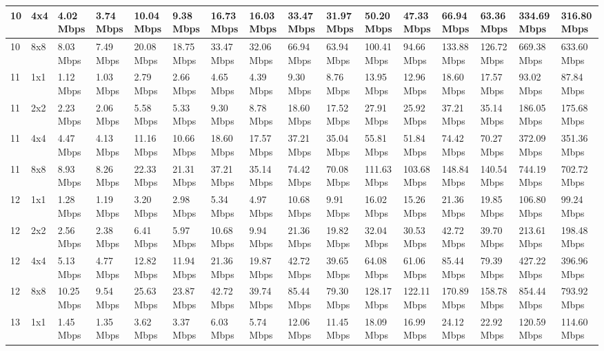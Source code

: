 \documentclass[12pt]{article}
\begin{document}
\begin{longtable}[c]{|l|l|l|l|l|l|l|l|l|l|l|l|l|l|l|l|}
10 & 4x4 & 4.02 Mbps & 3.74 Mbps & 10.04 Mbps & 9.38 Mbps & 16.73 Mbps & 16.03 Mbps & 33.47 Mbps & 31.97 Mbps & 50.20 Mbps & 47.33 Mbps & 66.94 Mbps & 63.36 Mbps & 334.69 Mbps & 316.80 Mbps \\ \hline
10 & 8x8 & 8.03 Mbps & 7.49 Mbps & 20.08 Mbps & 18.75 Mbps & 33.47 Mbps & 32.06 Mbps & 66.94 Mbps & 63.94 Mbps & 100.41 Mbps & 94.66 Mbps & 133.88 Mbps & 126.72 Mbps & 669.38 Mbps & 633.60 Mbps \\ \hline
11 & 1x1 & 1.12 Mbps & 1.03 Mbps & 2.79 Mbps & 2.66 Mbps & 4.65 Mbps & 4.39 Mbps & 9.30 Mbps & 8.76 Mbps & 13.95 Mbps & 12.96 Mbps & 18.60 Mbps & 17.57 Mbps & 93.02 Mbps & 87.84 Mbps \\ \hline
11 & 2x2 & 2.23 Mbps & 2.06 Mbps & 5.58 Mbps & 5.33 Mbps & 9.30 Mbps & 8.78 Mbps & 18.60 Mbps & 17.52 Mbps & 27.91 Mbps & 25.92 Mbps & 37.21 Mbps & 35.14 Mbps & 186.05 Mbps & 175.68 Mbps \\ \hline
11 & 4x4 & 4.47 Mbps & 4.13 Mbps & 11.16 Mbps & 10.66 Mbps & 18.60 Mbps & 17.57 Mbps & 37.21 Mbps & 35.04 Mbps & 55.81 Mbps & 51.84 Mbps & 74.42 Mbps & 70.27 Mbps & 372.09 Mbps & 351.36 Mbps \\ \hline
11 & 8x8 & 8.93 Mbps & 8.26 Mbps & 22.33 Mbps & 21.31 Mbps & 37.21 Mbps & 35.14 Mbps & 74.42 Mbps & 70.08 Mbps & 111.63 Mbps & 103.68 Mbps & 148.84 Mbps & 140.54 Mbps & 744.19 Mbps & 702.72 Mbps \\ \hline
12 & 1x1 & 1.28 Mbps & 1.19 Mbps & 3.20 Mbps & 2.98 Mbps & 5.34 Mbps & 4.97 Mbps & 10.68 Mbps & 9.91 Mbps & 16.02 Mbps & 15.26 Mbps & 21.36 Mbps & 19.85 Mbps & 106.80 Mbps & 99.24 Mbps \\ \hline
12 & 2x2 & 2.56 Mbps & 2.38 Mbps & 6.41 Mbps & 5.97 Mbps & 10.68 Mbps & 9.94 Mbps & 21.36 Mbps & 19.82 Mbps & 32.04 Mbps & 30.53 Mbps & 42.72 Mbps & 39.70 Mbps & 213.61 Mbps & 198.48 Mbps \\ \hline
12 & 4x4 & 5.13 Mbps & 4.77 Mbps & 12.82 Mbps & 11.94 Mbps & 21.36 Mbps & 19.87 Mbps & 42.72 Mbps & 39.65 Mbps & 64.08 Mbps & 61.06 Mbps & 85.44 Mbps & 79.39 Mbps & 427.22 Mbps & 396.96 Mbps \\ \hline
12 & 8x8 & 10.25 Mbps & 9.54 Mbps & 25.63 Mbps & 23.87 Mbps & 42.72 Mbps & 39.74 Mbps & 85.44 Mbps & 79.30 Mbps & 128.17 Mbps & 122.11 Mbps & 170.89 Mbps & 158.78 Mbps & 854.44 Mbps & 793.92 Mbps \\ \hline
13 & 1x1 & 1.45 Mbps & 1.35 Mbps & 3.62 Mbps & 3.37 Mbps & 6.03 Mbps & 5.74 Mbps & 12.06 Mbps & 11.45 Mbps & 18.09 Mbps & 16.99 Mbps & 24.12 Mbps & 22.92 Mbps & 120.59 Mbps & 114.60 Mbps \\ \hline

\end{longtable}
\end{document}
